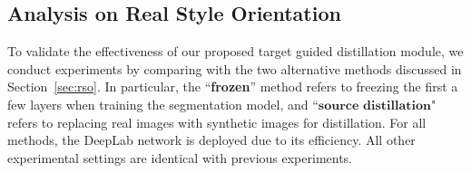 \documentclass[10pt,twocolumn,letterpaper]{article}
\begin{document}
\subsection{Analysis on Real Style Orientation}
\label{sec:exp_rso}

To validate the effectiveness of our proposed target guided distillation module, we conduct experiments by comparing with the two alternative methods discussed in Section~\ref{sec:rso}. In particular, the ``\textbf{frozen}'' method refers to freezing the first a few layers when training the segmentation model, and ``$\textbf{source distillation}$" refers to replacing real images with synthetic images for distillation. For all methods, the DeepLab network is deployed due to its efficiency. All other experimental settings are identical with previous experiments. 
\end{document}
